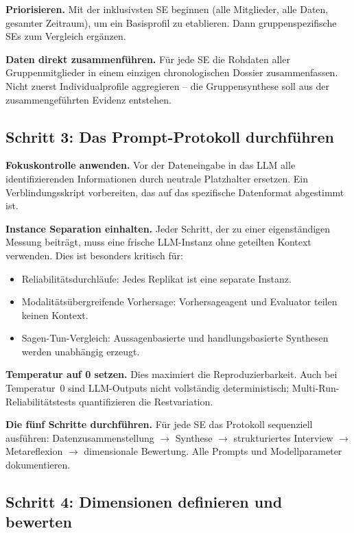 \documentclass[11pt,a4paper]{article}
\begin{document}
\textbf{Priorisieren.} Mit der inklusivsten SE beginnen (alle Mitglieder, alle Daten, gesamter Zeitraum), um ein Basisprofil zu etablieren. Dann gruppenspezifische SEs zum Vergleich erg\"anzen.

\textbf{Daten direkt zusammenf\"uhren.} F\"ur jede SE die Rohdaten aller Gruppenmitglieder in einem einzigen chronologischen Dossier zusammenfassen. Nicht zuerst Individualprofile aggregieren -- die Gruppensynthese soll aus der zusammengef\"uhrten Evidenz entstehen.

\subsection{Schritt 3: Das Prompt-Protokoll durchf\"uhren}
\label{sec:app:step3}

\textbf{Fokuskontrolle anwenden.} Vor der Dateneingabe in das LLM alle identifizierenden Informationen durch neutrale Platzhalter ersetzen. Ein Verblindungsskript vorbereiten, das auf das spezifische Datenformat abgestimmt ist.

\textbf{Instance Separation einhalten.} Jeder Schritt, der zu einer eigenst\"andigen Messung beitr\"agt, muss eine frische LLM-Instanz ohne geteilten Kontext verwenden. Dies ist besonders kritisch f\"ur:
\begin{itemize}[nosep]
  \item Reliabilit\"atsdurchl\"aufe: Jedes Replikat ist eine separate Instanz.
  \item Modalit\"ats\"ubergreifende Vorhersage: Vorhersageagent und Evaluator teilen keinen Kontext.
  \item Sagen-Tun-Vergleich: Aussagenbasierte und handlungsbasierte Synthesen werden unabh\"angig erzeugt.
\end{itemize}

\textbf{Temperatur auf 0 setzen.} Dies maximiert die Reproduzierbarkeit. Auch bei Temperatur~0 sind LLM-Outputs nicht vollst\"andig deterministisch; Multi-Run-Reliabilit\"atstests quantifizieren die Restvariation.

\textbf{Die f\"unf Schritte durchf\"uhren.} F\"ur jede SE das Protokoll sequenziell ausf\"uhren: Datenzusammenstellung $\to$ Synthese $\to$ strukturiertes Interview $\to$ Metareflexion $\to$ dimensionale Bewertung. Alle Prompts und Modellparameter dokumentieren.

\subsection{Schritt 4: Dimensionen definieren und bewerten}
\label{sec:app:step4}
\end{document}
